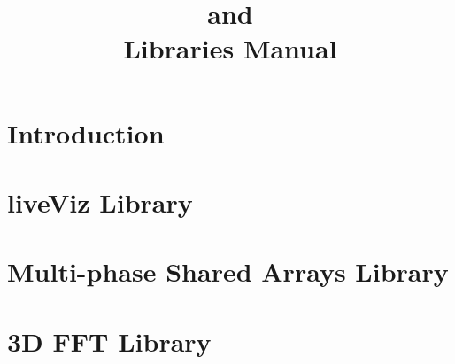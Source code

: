 \documentclass[10pt]{report}
\title{\converse{} and \charmpp{}\\ Libraries Manual}
\begin{document}
\maketitle

\chapter{Introduction}

\chapter{liveViz Library}

\chapter{Multi-phase Shared Arrays Library}

\chapter{3D FFT Library}



\end{document}
